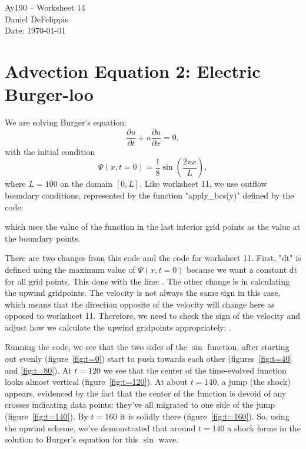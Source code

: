\documentclass[11pt,letterpaper]{article}
\begin{document}
\begin{center}
\Large
Ay190 -- Worksheet 14\\
Daniel DeFelippis\\
Date: \today
\end{center}


\section*{Advection Equation 2: Electric Burger-loo}

We are solving Burger's equation:
$$ \frac{\partial u}{\partial t} + u\frac{\partial u}{\partial x} = 0, $$
with the initial condition 
$$ \Psi(x,t=0) = \frac{1}{8} \sin\left(\frac{2\pi x}{L}\right), $$
where $L=100$ on the domain $[0,L]$. Like worksheet 11, we use outflow 
boundary conditions, represented by the function "apply\_bcs(y)" defined by the code:

which uses the value of the function in the last interior grid points 
as the value at the boundary points.

There are two changes from this code and the code for worksheet 11. First, "dt" is 
defined using the maximum value of $\Psi(x,t=0)$ because we want a constant dt for all
grid points. This done with the line:
.
The other change is in calculating the upwind gridpoints. The velocity is not always the
same sign in this case, which means that the direction opposite of the velocity will 
change here as opposed to worksheet 11. Therefore, we need to check the sign of 
the velocity and adjust how we calculate the upwind gridpoints appropriately:
.

Running the code, we see that the two sides of the $\sin$ function, after starting out 
evenly (figure~\ref{fig:t=0}) start to push towards each other 
(figures~\ref{fig:t=40} and \ref{fig:t=80}). At $t = 120$ we see that the 
center of the time-evolved function looks almost vertical (figure~\ref{fig:t=120}). 
At about $t=140$, a jump (the shock) appears, evidenced by the fact that the center of 
the function is devoid of any crosses indicating data points: they've all 
migrated to one side of the jump (figure~\ref{fig:t=140}). 
By $t=160$ it is solidly there (figure~\ref{fig:t=160}).
So, using the upwind scheme, we've demonstrated that around $t=140$ a shock forms in the 
solution to Burger's equation for this $\sin$ wave.
\end{document}
